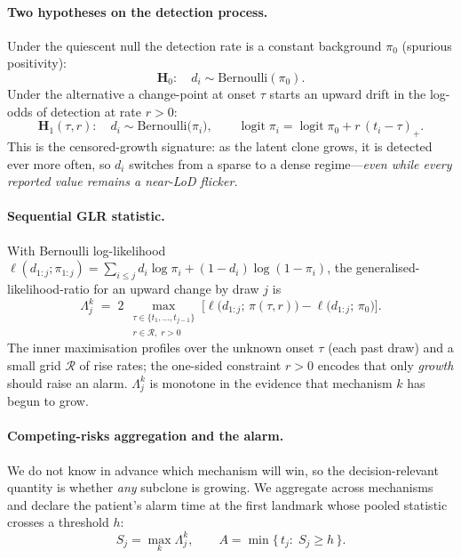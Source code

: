 \documentclass[11pt]{article}
\newcommand{\logit}{\operatorname{logit}}
\newcommand{\1}{\mathbf{1}}
\begin{document}
\paragraph{Two hypotheses on the detection process.}
Under the quiescent null the detection rate is a constant background
$\pi_0$ (spurious positivity):
\[
\textbf{H}_0:\quad d_i\sim\mathrm{Bernoulli}(\pi_0).
\]
Under the alternative a change-point at onset $\tau$ starts an upward drift in the
log-odds of detection at rate $r>0$:
\[
\textbf{H}_1(\tau,r):\quad d_i\sim\mathrm{Bernoulli}\!\big(\pi_i\big),\qquad
\logit \pi_i=\logit\pi_0+r\,(t_i-\tau)_+ .
\]
This is the censored-growth signature: as the latent clone grows, it is detected
ever more often, so $d_i$ switches from a sparse to a dense regime---\emph{even
while every reported value remains a near-LoD flicker.}

\paragraph{Sequential GLR statistic.}
With Bernoulli log-likelihood
$\ell(d_{1:j};\pi_{1:j})=\sum_{i\le j} d_i\log\pi_i+(1-d_i)\log(1-\pi_i)$,
the generalised-likelihood-ratio for an upward change by draw $j$ is
\begin{equation}
\Lambda^k_j \;=\; 2\,\max_{\substack{\tau\in\{t_1,\dots,t_{j-1}\}\\ r\in\mathcal R,\;r>0}}
\Big[\ell\big(d_{1:j};\,\pi(\tau,r)\big)-\ell\big(d_{1:j};\,\pi_0\big)\Big].
\label{eq:glr}
\end{equation}
The inner maximisation profiles over the unknown onset $\tau$ (each past draw) and
a small grid $\mathcal R$ of rise rates; the one-sided constraint $r>0$ encodes
that only \emph{growth} should raise an alarm. $\Lambda^k_j$ is monotone in the
evidence that mechanism $k$ has begun to grow.

\paragraph{Competing-risks aggregation and the alarm.}
We do not know in advance which mechanism will win, so the decision-relevant
quantity is whether \emph{any} subclone is growing. We aggregate across mechanisms
and declare the patient's alarm time at the first landmark whose pooled statistic
crosses a threshold $h$:
\begin{equation}
S_j=\max_k \Lambda^k_j,\qquad
A=\min\{\,t_j:\; S_j\ge h\,\}.
\label{eq:alarm}
\end{equation}
\end{document}
